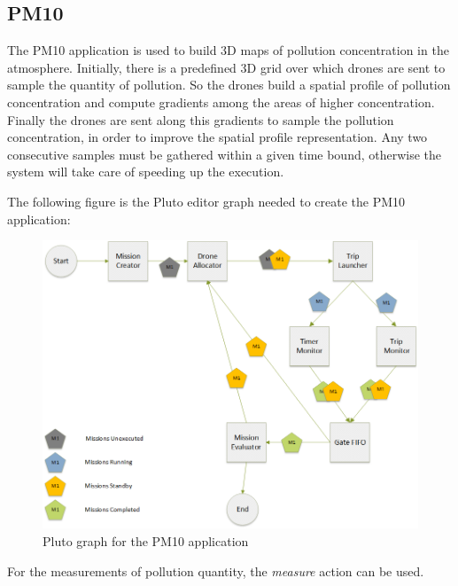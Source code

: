 


\subsection{PM10}

The PM10\cite{pm10} application is used to build 3D maps of pollution concentration in the atmosphere. 
Initially, there is a predefined 3D grid over which drones are sent to sample the quantity of pollution.
So the drones build a spatial profile of pollution concentration and compute gradients among the areas of higher concentration.
Finally the drones are sent along this gradients to sample the pollution concentration, in order to improve the spatial profile representation.
Any two consecutive samples must be gathered within a given time bound, otherwise the system will take care of speeding up the execution.

The following figure is the Pluto editor graph needed to create the PM10 application:

\begin{figure}[H]
  \centering
  \includegraphics[width=\linewidth]{pictures/Putti_Diagram.png}
  \caption{Pluto graph for the PM10 application}
  \label{fig:pm10Graph}
\end{figure}


For the measurements of pollution quantity, the \textit{measure} action can be used.
\\


